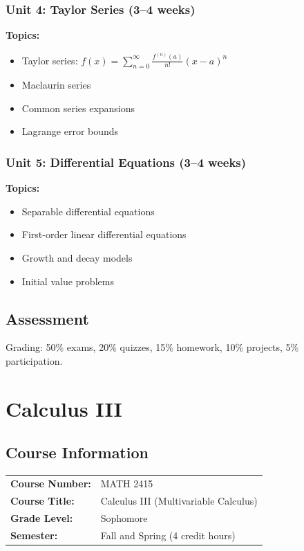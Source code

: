 \documentclass[12pt,oneside]{book}
\begin{document}
\subsection{Unit 4: Taylor Series (3--4 weeks)}

\textbf{Topics:}
\begin{itemize}
    \item Taylor series: $f(x) = \sum_{n=0}^{\infty} \frac{f^{(n)}(a)}{n!}(x-a)^n$
    \item Maclaurin series
    \item Common series expansions
    \item Lagrange error bounds
\end{itemize}

\subsection{Unit 5: Differential Equations (3--4 weeks)}

\textbf{Topics:}
\begin{itemize}
    \item Separable differential equations
    \item First-order linear differential equations
    \item Growth and decay models
    \item Initial value problems
\end{itemize}

\section{Assessment}

Grading: 50\% exams, 20\% quizzes, 15\% homework, 10\% projects, 5\% participation.


\chapter{Calculus III}

\section{Course Information}

\begin{tabular}{ll}
\textbf{Course Number:} & MATH 2415 \\
\textbf{Course Title:} & Calculus III (Multivariable Calculus) \\
\textbf{Grade Level:} & Sophomore \\
\textbf{Semester:} & Fall and Spring (4 credit hours) \\
\end{tabular}
\end{document}

